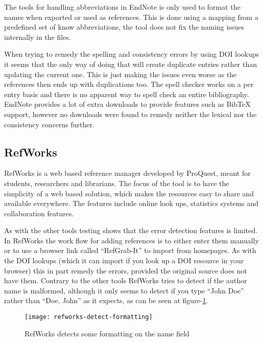 The tools for handling abbreviations in EndNote is only used to format
the names when exported or used as references.  This is done using a
mapping from a predefined set of know abbreviations, the tool does not
fix the naming issues internally in the
files\cite{endnote_terms_journals}.

When trying to remedy the spelling and consistency errors by using DOI
lookups it seems that the only way of doing that will create duplicate
entries rather than updating the current one. This is just making the
issues even worse as the references then ends up with duplications
too.  The spell checker works on a per entry basis and there is no
apparent way to spell check an entire bibliography.  EndNote provides
a lot of extra downloads to provide features such as Bib{\TeX}
support, however no downloads were found to remedy neither the lexical
nor the consistency concerns further\cite{endnote_downloads}.

\subsection{RefWorks}
RefWorks is a web based reference manager developed by ProQuest, meant
for students, researchers and librarians.  The focus of the tool is to
have the simplicity of a web based solution, which makes the resources
easy to share and available everywhere.  The features include online
look ups, statistics systems and collaboration
features\cite{refworks_features}.

As with the other tools testing shows that the error detection
features is limited.  In RefWorks the work flow for adding references
is to either enter them manually or to use a browser link called
``RefGrab-It'' to import from homepages.  As with the DOI lookups
(which it can import if you look up a DOI resource in your browser)
this in part remedy the errors, provided the original source does not
have them.  Contrary to the other tools RefWorks tries to detect if
the author name is malformed, although it only seems to detect if you
type ``John Doe'' rather than ``Doe, John'' as it expects, as can be
seen at figure-\ref{fig:refworks-detect-formatting}.

\begin{figure}[h]
    \centering
    \texttt{[image: refworks-detect-formatting]}
    \caption{RefWorks detects some formatting on the name field}
    \label{fig:refworks-detect-formatting}
\end{figure}


